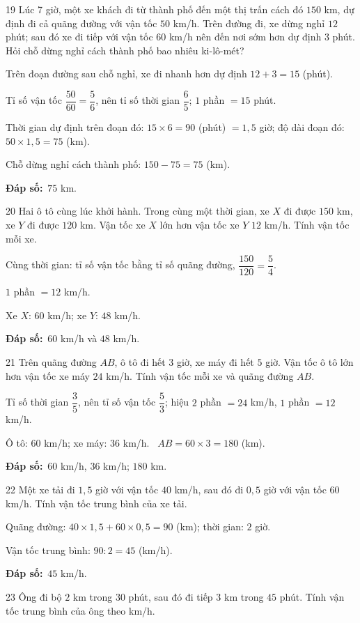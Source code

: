 \documentclass[11pt]{article}
\newif\ifsol \solfalse
\providecommand{\AnsWord}{Đáp số}
\newcommand{\dapso}[1]{\par\textbf{\AnsWord:}\ #1}
\newcommand{\probsol}[1]{%
  \begin{lrbox}{\solmeasure}\begin{minipage}{\dimexpr\linewidth-24pt\relax}#1\end{minipage}\end{lrbox}%
  \ifsol
    \begin{solbox}#1\end{solbox}%
  \else
    \setlength{\solht}{\dimexpr\ht\solmeasure+\dp\solmeasure+0.85cm\relax}%
    \ifdim\solht<1.35cm\setlength{\solht}{1.35cm}\fi
    \begin{tcolorbox}[colback=white,colframe=Line,boxrule=0.8pt,arc=5pt,
      left=8pt,right=8pt,top=4pt,bottom=4pt,height=\solht]{\footnotesize\color{Slate}\itshape\WorkWord}\end{tcolorbox}%
  \fi}
\newcommand{\gap}{\vspace{0.3cm}}
\def\WorkWord{Bài làm:}
\def\AnsWord{Đáp số}
\begin{document}
\gap
\begin{probbox}{19}{\relax}
Lúc 7 giờ, một xe khách đi từ thành phố đến một thị trấn cách đó $150$ km, dự định đi cả quãng đường với vận tốc $50$ km/h. Trên đường đi, xe dừng nghỉ $12$ phút; sau đó xe đi tiếp với vận tốc $60$ km/h nên đến nơi sớm hơn dự định $3$ phút. Hỏi chỗ dừng nghỉ cách thành phố bao nhiêu ki-lô-mét?
\end{probbox}
\probsol{
Trên đoạn đường sau chỗ nghỉ, xe đi nhanh hơn dự định $12+3=15$ (phút).\par Tỉ số vận tốc $\dfrac{50}{60}=\dfrac56$, nên tỉ số thời gian $\dfrac65$; $1$ phần $=15$ phút.\par
Thời gian dự định trên đoạn đó: $15\times6=90$ (phút) $=1{,}5$ giờ; độ dài đoạn đó: $50\times1{,}5=75$ (km).\par
Chỗ dừng nghỉ cách thành phố: $150-75=75$ (km).
\dapso{$75$ km.}}
\gap
\begin{probbox}{20}{\relax}
Hai ô tô cùng lúc khởi hành. Trong cùng một thời gian, xe $X$ đi được $150$ km, xe $Y$ đi được $120$ km. Vận tốc xe $X$ lớn hơn vận tốc xe $Y$ $12$ km/h. Tính vận tốc mỗi xe.
\end{probbox}
\probsol{
Cùng thời gian: tỉ số vận tốc bằng tỉ số quãng đường, $\dfrac{150}{120}=\dfrac54$.\par $1$ phần $=12$ km/h.\par Xe $X$: $60$ km/h; xe $Y$: $48$ km/h.
\dapso{$60$ km/h và $48$ km/h.}}
\gap
\begin{probbox}{21}{\relax}
Trên quãng đường $AB$, ô tô đi hết $3$ giờ, xe máy đi hết $5$ giờ. Vận tốc ô tô lớn hơn vận tốc xe máy $24$ km/h. Tính vận tốc mỗi xe và quãng đường $AB$.
\end{probbox}
\probsol{
Tỉ số thời gian $\dfrac35$, nên tỉ số vận tốc $\dfrac53$; hiệu $2$ phần $=24$ km/h, $1$ phần $=12$ km/h.\par
Ô tô: $60$ km/h; xe máy: $36$ km/h. \ $AB=60\times3=180$ (km).
\dapso{$60$ km/h, $36$ km/h; $180$ km.}}
\gap
\begin{probbox}{22}{\relax}
Một xe tải đi $1{,}5$ giờ với vận tốc $40$ km/h, sau đó đi $0{,}5$ giờ với vận tốc $60$ km/h. Tính vận tốc trung bình của xe tải.
\end{probbox}
\probsol{
Quãng đường: $40\times1{,}5+60\times0{,}5=90$ (km); thời gian: $2$ giờ.\par Vận tốc trung bình: $90:2=45$ (km/h).
\dapso{$45$ km/h.}}
\gap
\begin{probbox}{23}{\relax}
Ông đi bộ $2$ km trong $30$ phút, sau đó đi tiếp $3$ km trong $45$ phút. Tính vận tốc trung bình của ông theo km/h.
\end{probbox}
\end{document}
